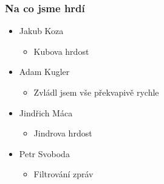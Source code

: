 \documentclass{beamer}
\begin{document}
\begin{frame}[allowframebreaks]\frametitle{Na co jsme hrdí} 
  \begin{itemize}
    \item Jakub Koza
      \begin{itemize}
       \item Kubova hrdost
     \end{itemize}
   
    \item Adam Kugler
      \begin{itemize}
       \item Zvládl jsem vše překvapivě rychle
     \end{itemize}

    \item Jindřich Máca
      \begin{itemize}
       \item Jindrova hrdost
      \end{itemize}  
   
    \item Petr Svoboda
      \begin{itemize}
       \item Filtrování zpráv
     \end{itemize}
   \end{itemize}  
\end{frame}
\end{document}
